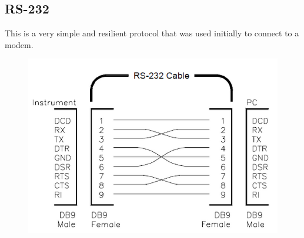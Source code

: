 \documentclass{hw}
\begin{document}
\subsection{RS-232}
This is a very simple and resilient protocol that was used initially to connect
to a modem.
\begin{figure}[H]
  \centering
  \includegraphics[scale=.6]{img/rs1}
\end{figure}
\end{document}
